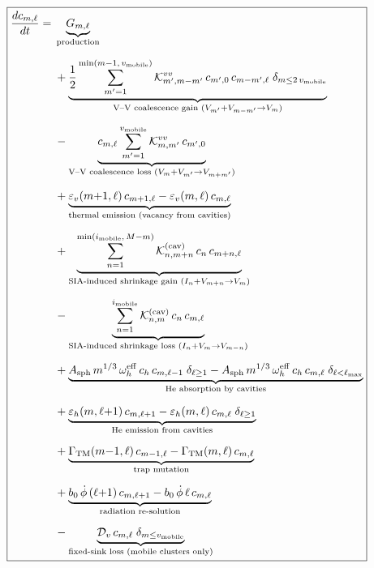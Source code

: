 \documentclass[pdflatex,sn-basic]{sn-jnl} %
\begin{document}
\clearpage
\begin{equation}\label{eq:ME_vac}
\boxed{
\begin{split}
\frac{dc_{m,\ell}}{dt} = {} &
  \underbrace{G_{m,\ell}}_{\text{production}}
  \\[6pt]
  &+ \underbrace{
     \frac{1}{2}\sum_{m'=1}^{\min(m-1,\,v_{\rm mobile})}
     \mathcal{K}_{m',m-m'}^{vv}\,c_{m',0}\,c_{m-m',\ell}
     \;\delta_{m \leq 2\,v_{\rm mobile}}
     }_{\text{V--V coalescence gain } (V_{m'}+V_{m-m'}\to V_m)}
  \\[6pt]
  &- \underbrace{
     c_{m,\ell}\sum_{m'=1}^{v_{\rm mobile}}
     \mathcal{K}_{m,m'}^{vv}\,c_{m',0}
     }_{\text{V--V coalescence loss } (V_m+V_{m'}\to V_{m+m'})}
  \\[6pt]
  &+ \underbrace{
     \varepsilon_v(m{+}1,\ell)\,c_{m+1,\ell}
   - \varepsilon_v(m,\ell)\,c_{m,\ell}
     }_{\text{thermal emission (vacancy from cavities)}}
  \\[6pt]
  &+ \underbrace{
     \sum_{n=1}^{\min(i_{\rm mobile},\,M-m)}
     \mathcal{K}_{n,m+n}^{(\mathrm{cav})}\,c_n\,c_{m+n,\ell}
     }_{\text{SIA-induced shrinkage gain } (I_n + V_{m+n}\to V_m)}
  \\[6pt]
  &- \underbrace{
     \sum_{n=1}^{i_{\rm mobile}}
     \mathcal{K}_{n,m}^{(\mathrm{cav})}\,c_n\,c_{m,\ell}
     }_{\text{SIA-induced shrinkage loss } (I_n + V_m\to V_{m-n})}
  \\[6pt]
  &+ \underbrace{
     A_{\mathrm{sph}}\,m^{1/3}\,\omega_h^{\mathrm{eff}}\,
     c_h\,c_{m,\ell-1}\;\delta_{\ell \geq 1}
   - A_{\mathrm{sph}}\,m^{1/3}\,\omega_h^{\mathrm{eff}}\,
     c_h\,c_{m,\ell}\;\delta_{\ell < \ell_{\max}}
     }_{\text{He absorption by cavities}}
  \\[6pt]
  &+ \underbrace{
     \varepsilon_h(m,\ell{+}1)\,c_{m,\ell+1}
   - \varepsilon_h(m,\ell)\,c_{m,\ell}\;\delta_{\ell \geq 1}
     }_{\text{He emission from cavities}}
  \\[6pt]
  &+ \underbrace{
     \Gamma_{\mathrm{TM}}(m{-}1,\ell)\,c_{m-1,\ell}
   - \Gamma_{\mathrm{TM}}(m,\ell)\,c_{m,\ell}
     }_{\text{trap mutation}}
  \\[6pt]
  &+ \underbrace{
     b_0\,\dot{\phi}\,(\ell{+}1)\,c_{m,\ell+1}
   - b_0\,\dot{\phi}\,\ell\,c_{m,\ell}
     }_{\text{radiation re-solution}}
  \\[6pt]
  &- \underbrace{
     \mathcal{D}_v\,c_{m,\ell}\;\delta_{m \leq v_{\rm mobile}}
     }_{\text{fixed-sink loss (mobile clusters only)}}
\end{split}
}
\end{equation}
\end{document}
